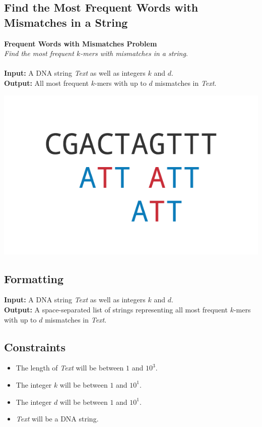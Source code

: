 \documentclass{article}
\begin{document}
\subsection{Find the Most Frequent Words with Mismatches in a String}
\hline\vspace{5}
\noindent \textbf{Frequent Words with Mismatches Problem}\\
\emph{Find the most frequent $k$-mers with mismatches in a string}.\\ \\
\textbf{Input:} A DNA string \emph{Text} as well as integers $k$ and $d$.\\
\textbf{Output:} All most frequent $k$-mers with up to $d$ mismatches in \emph{Text}.
\begin{center}
    \includegraphics[scale=0.2]{c1/logos/1I.png} 
\end{center}
\hline\vspace{5}

\subsection*{Formatting}
\textbf{Input:} A DNA string \emph{Text} as well as integers $k$ and $d$.\\
\noindent \textbf{Output:} A space-separated list of strings representing all most frequent $k$-mers with up to $d$ mismatches in \emph{Text}.

\subsection*{Constraints}
\begin{itemize}
    \item The length of \emph{Text} will be between $1$ and $10^3$.
    \item The integer $k$ will be between $1$ and $10^1$.
    \item The integer $d$ will be between $1$ and $10^1$.
    \item \emph{Text} will be a DNA string.
\end{itemize}
\pagebreak
\end{document}
